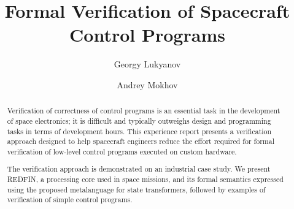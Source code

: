 \documentclass[acmsmall,screen]{acmart}
\begin{document}
\title{Formal Verification of Spacecraft Control Programs}

\author{Georgy Lukyanov}
\author{Andrey Mokhov}


\begin{abstract}
Verification of correctness of control programs is an essential task
in the development of space electronics; it is difficult and typically
outweighs design and programming tasks in terms of development hours.
This experience report presents a verification approach designed to help
spacecraft engineers reduce the effort required for formal verification of
low-level control programs executed on custom hardware.


The verification approach is demonstrated on an industrial case study.
We present REDFIN, a processing core used in space missions, and its formal
semantics expressed using the proposed metalanguage for state transformers,
followed by examples of verification of simple control programs.

\end{abstract}

\keywords{}

\maketitle








\begin{acks}
\end{acks}

\newpage

\end{document}

